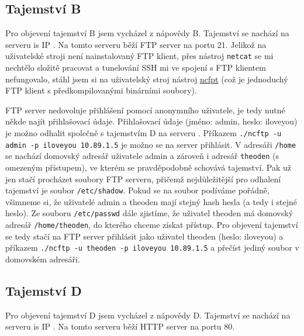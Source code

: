 \documentclass[a4paper, 11pt]{article}
\begin{document}
\subsection{Tajemství B}
Pro objevení tajemství B jsem vycházel z nápovědy B. Tajemství se nachází na serveru  is IP . Na tomto serveru běží FTP server na portu 21. Jelikož na uživatelské stroji není nainstalovaný FTP klient, přes nástroj \texttt{netcat} se mi nechtělo složitě pracovat a tunelování SSH mi ve spojení s FTP klientem nefungovalo, stáhl jsem si na uživatelský stroj nástroj \href{https://www.ncftp.com}{ncfpt} (což je jednoduchý FTP klient s předkompilovanými binárními soubory).

FTP server nedovoluje přihlášení pomocí anonymního uživatele, je tedy nutné někde najít přihlašovací údaje. Přihlašovací údaje (jméno: admin, heslo: iloveyou) je možno odhalit společně s tajemstvím D na serveru . Příkazem \verb|./ncftp -u admin -p iloveyou 10.89.1.5| je možno se na server přihlásit. V adresáři \texttt{/home} se nachází domovský adresář uživatele admin a zároveň i adresář \texttt{theoden} (s omezeným přístupem), ve kterém se pravděpodobně schovává tajemství. Pak už jen stačí procházet soubory FTP serveru, přičemž nejdůležitější pro odhalení tajemství je soubor \texttt{/etc/shadow}. Pokud se na soubor podíváme pořádně, všimneme si, že uživatelé admin a theoden mají stejný hash hesla (a tedy i stejné heslo). Ze souboru \texttt{/etc/passwd} dále zjistíme, že uživatel theoden má domovský adresář  \texttt{/home/theoden}, do kterého chceme získat přístup. Pro objevení tajemství se tedy stačí na FTP server přihlásit jako uživatel theoden (heslo: iloveyou) a příkazem \verb|./ncftp -u theoden -p iloveyou 10.89.1.5| a přečíst jediný soubor v domovském adresáři.



\subsection{Tajemství D}
Pro objevení tajemství D jsem vycházel z nápovědy D. Tajemství se nachází na serveru  is IP . Na tomto serveru běží HTTP server na portu 80. 
\end{document}
